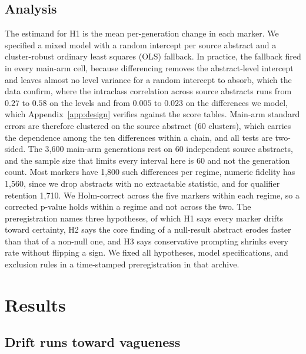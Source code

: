 \documentclass{article}
\begin{document}
\subsection{Analysis}

The estimand for H1 is the mean per-generation change in each marker. We specified a mixed model with a random intercept per source abstract and a cluster-robust ordinary least squares (OLS) fallback. In practice, the fallback fired in every main-arm cell, because differencing removes the abstract-level intercept and leaves almost no level variance for a random intercept to absorb, which the data confirm, where the intraclass correlation across source abstracts runs from $0.27$ to $0.58$ on the levels and from $0.005$ to $0.023$ on the differences we model, which Appendix~\ref{app:design} verifies against the score tables. Main-arm standard errors are therefore clustered on the source abstract (60 clusters), which carries the dependence among the ten differences within a chain, and all tests are two-sided. The 3{,}600 main-arm generations rest on 60 independent source abstracts, and the sample size that limits every interval here is 60 and not the generation count. Most markers have 1{,}800 such differences per regime, numeric fidelity has 1{,}560, since we drop abstracts with no extractable statistic, and for qualifier retention 1{,}710. We Holm-correct across the five markers within each regime, so a corrected p-value holds within a regime and not across the two. The preregistration names three hypotheses, of which H1 says every marker drifts toward certainty, H2 says the core finding of a null-result abstract erodes faster than that of a non-null one, and H3 says conservative prompting shrinks every rate without flipping a sign. We fixed all hypotheses, model specifications, and exclusion rules in a time-stamped preregistration in that archive.

\section{Results}

\subsection{Drift runs toward vagueness}
\end{document}
